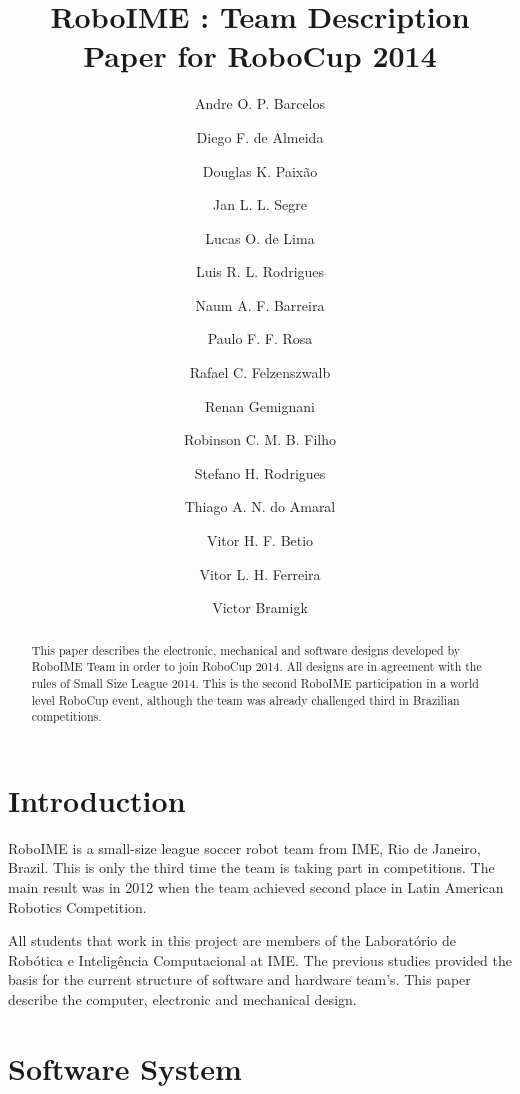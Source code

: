 \documentclass{llncs}
\begin{document}
\title{RoboIME : Team Description Paper for RoboCup 2014}
\author{
 Andre O. P. Barcelos \and
 Diego F. de Almeida \and
 Douglas K. Paixão \and
 Jan L. L. Segre \and
 Lucas O. de Lima \and
 Luis R. L. Rodrigues \and
 Naum A. F. Barreira \and
 Paulo F. F. Rosa \and
 Rafael C. Felzenszwalb \and
 Renan Gemignani \and
 Robinson C. M. B. Filho \and
 Stefano H. Rodrigues \and
 Thiago A. N. do Amaral \and
 Vitor H. F. Betio \and
 Vitor L. H. Ferreira \and
 Victor Bramigk
}

\maketitle
%
\begin{abstract}
This paper describes the electronic, mechanical and software designs developed by RoboIME Team in order to join RoboCup 2014. All designs are in agreement with the rules of Small Size League 2014. This is the second RoboIME participation in a world level RoboCup event, although the team was already challenged third in Brazilian competitions.
\end{abstract}

\section{Introduction}
RoboIME is a small-size league soccer robot team from IME, Rio de Janeiro, Brazil. This is only the third time the team is taking part in competitions. The main result was in 2012 when the team achieved second place in Latin American Robotics Competition.

All students that work in this project are members of the Laboratório de Robótica e Inteligência Computacional at IME. The previous studies \cite{alexandre}\cite{marco} provided the basis for the current structure of software and hardware team's. This paper describe the computer, electronic and mechanical design.

\section{Software System}
\end{document}
